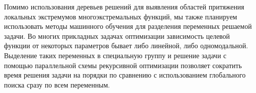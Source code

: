 \documentclass[runningheads]{llncs}
\begin{document}
Помимо использования деревьев решений для выявления областей притяжения локальных экстремумов многоэкстремальных функций, мы также планируем использовать методы машинного обучения для разделения переменных решаемой задачи. Во многих прикладных задачах оптимизации зависимость целевой функции от некоторых параметров бывает либо линейной, либо одномодальной. Выделение таких переменных в специальную группу и решение задачи с помощью параллельной схемы рекурсивной оптимизации \cite{Barkalov2020_1} позволяет сократить время решения задачи на порядки по сравнению с использованием глобального поиска сразу по всем переменным.

%
%

{}
\end{document}
